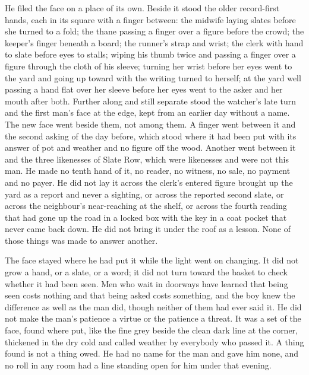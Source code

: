 He filed the face on a place of its own. Beside it stood the older record-first hands, each in its square with a finger between: the midwife laying slates before she turned to a fold; the thane passing a finger over a figure before the crowd; the keeper's finger beneath a board; the runner's strap and wrist; the clerk with hand to slate before eyes to stalls;  wiping his thumb twice and passing a finger over a figure through the cloth of his sleeve;  turning her wrist before her eyes went to the yard and going up  toward  with the writing turned to herself;  at the yard well passing a hand flat over her sleeve before her eyes went to the asker and her mouth after both. Further along and still separate stood the watcher's late turn and the first man's face at the edge, kept from an earlier day without a name. The new face went beside them, not among them. A finger went between it and the second asking of the day before, which stood where it had been put with its answer of pot and weather and no figure off the wood. Another went between it and the three likenesses of Slate Row, which were likenesses and were not this man. He made no tenth hand of it, no reader, no witness, no sale, no payment and no payer. He did not lay it across the clerk's entered figure brought up the yard as a report and never a sighting, or across the reported second slate, or across the neighbour's near-reaching at the shelf, or across the fourth reading that had gone up the road in a locked box with the key in a coat pocket that never came back down. He did not bring it under the roof as a lesson. None of those things was made to answer another.

The face stayed where he had put it while the light went on changing. It did not grow a hand, or a slate, or a word; it did not turn toward the basket to check whether it had been seen. Men who wait in doorways have learned that being seen costs nothing and that being asked costs something, and the boy knew the difference as well as the man did, though neither of them had ever said it. He did not make the man's patience a virtue or the patience a threat. It was a set of the face, found where put, like the fine grey beside the clean dark line at the corner, thickened in the dry cold and called weather by everybody who passed it. A thing found is not a thing owed. He had no name for the man and gave him none, and no roll in any room had a line standing open for him under that evening.

